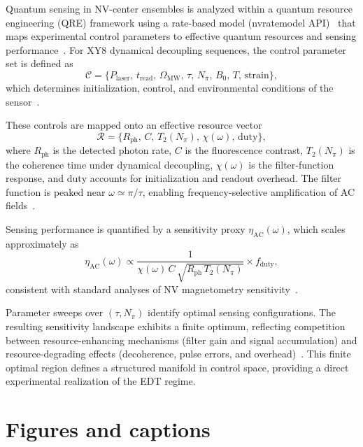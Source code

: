 \documentclass[twocolumn,10pt]{article}
\begin{document}
Quantum sensing in NV-center ensembles is analyzed within a quantum resource engineering (QRE) framework using a rate-based model (nvratemodel API)~\cite{NVRateModel2023} that maps experimental control parameters to effective quantum resources and sensing performance~\cite{Degen2017,Barry2020}. For XY8 dynamical decoupling sequences, the control parameter set is defined as
\begin{equation}
\mathcal{C} = \{P_{\mathrm{laser}},\, t_{\mathrm{read}},\, \Omega_{\mathrm{MW}},\, \tau,\, N_{\pi},\, B_0,\, T,\, \mathrm{strain}\},
\end{equation}
which determines initialization, control, and environmental conditions of the sensor~\cite{Casola2018}.

These controls are mapped onto an effective resource vector
\begin{equation}
\mathcal{R} = \{R_{\mathrm{ph}},\, C,\, T_2(N_{\pi}),\, \chi(\omega),\, \mathrm{duty}\},
\end{equation}
where $R_{\mathrm{ph}}$ is the detected photon rate, $C$ is the fluorescence contrast, $T_2(N_{\pi})$ is the coherence time under dynamical decoupling, $\chi(\omega)$ is the filter-function response, and $\mathrm{duty}$ accounts for initialization and readout overhead. The filter function is peaked near $\omega \simeq \pi/\tau$, enabling frequency-selective amplification of AC fields~\cite{Cywinski2008}.

Sensing performance is quantified by a sensitivity proxy $\eta_{\mathrm{AC}}(\omega)$, which scales approximately as
\begin{equation}
\eta_{\mathrm{AC}}(\omega) \propto \frac{1}{\chi(\omega)\,C\,\sqrt{R_{\mathrm{ph}}\,T_2(N_{\pi})}} \times f_{\mathrm{duty}},
\end{equation}
consistent with standard analyses of NV magnetometry sensitivity~\cite{Degen2017,Barry2020}.

Parameter sweeps over $(\tau, N_{\pi})$ identify optimal sensing configurations. The resulting sensitivity landscape exhibits a finite optimum, reflecting competition between resource-enhancing mechanisms (filter gain and signal accumulation) and resource-degrading effects (decoherence, pulse errors, and overhead)~\cite{Cywinski2008,Casola2018}. This finite optimal region defines a structured manifold in control space, providing a direct experimental realization of the EDT regime.

\section*{Figures and captions}
\end{document}
